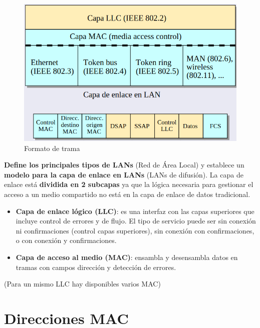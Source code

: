 \documentclass{article}
\begin{document}
\begin{figure}
    \centering
    \includegraphics[width=\linewidth]{img-t5/img_682_18.png}
    \caption{Formato de trama}
\end{figure}

\textbf{Define los principales tipos de LANs} (Red de Área Local) y establece un \textbf{modelo para la capa de enlace en LANs} (LANs de difusión). La capa de enlace está \textbf{dividida en 2 subcapas} ya que la lógica necesaria para gestionar el acceso a un medio compartido no está en la capa de enlace de datos tradicional.

\begin{itemize}
    \item \textbf{Capa de enlace lógico (LLC)}: es una interfaz con las capas superiores que incluye control de errores y de flujo. El tipo de servicio puede ser sin conexión ni confirmaciones (control capas superiores), sin conexión con confirmaciones, o con conexión y confirmaciones.

    \item \textbf{Capa de acceso al medio (MAC)}: ensambla y desensambla datos en tramas con campos dirección y detección de errores.
\end{itemize}
(Para un mismo LLC hay disponibles varios MAC)

\newpage

\section{Direcciones MAC}
\end{document}
